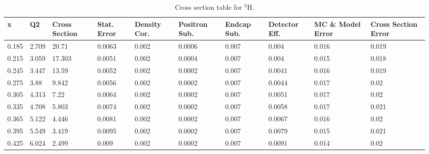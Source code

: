 \pagebreak
{}
\thispagestyle{lscape}
\begin{landscape}

	\begin{table}
			\centering
	\caption{Cross section table for $^3$H.}\label{CST_He3}
	\begin{tabular}{|p{1cm}|p{1cm}|p{1.5cm}|p{1.5cm}|p{2cm}|p{2cm}|p{1.5cm}|p{1.5cm}|p{2.5cm}|p{2.5cm}|}
	\hline
	x     & Q2     & Cross Section & Stat. Error & Density Cor. & Positron Sub. & Endcap Sub. & Detector Eff. & MC \& Model Error & Cross Section Error \\ \hline
		0.185 & 2.709  & 20.71         & 0.0063            & 0.002              & 0.0006               & 0.007              & 0.004                 & 0.016             & 0.019               \\ \hline
		0.215 & 3.059  & 17.303        & 0.0051            & 0.002              & 0.0004               & 0.007              & 0.004                 & 0.015             & 0.018               \\ \hline
		0.245 & 3.447  & 13.59         & 0.0052            & 0.002              & 0.0002               & 0.007              & 0.0041                & 0.016             & 0.019               \\ \hline
		0.275 & 3.88   & 9.842         & 0.0056            & 0.002              & 0.0002               & 0.007              & 0.0044                & 0.017             & 0.02                \\ \hline
		0.305 & 4.313  & 7.22          & 0.0064            & 0.002              & 0.0002               & 0.007              & 0.0051                & 0.017             & 0.02                \\ \hline
		0.335 & 4.708  & 5.803         & 0.0074            & 0.002              & 0.0002               & 0.007              & 0.0058                & 0.017             & 0.021               \\ \hline
		0.365 & 5.122  & 4.446         & 0.0081            & 0.002              & 0.0002               & 0.007              & 0.0067                & 0.016             & 0.02                \\ \hline
		0.395 & 5.549  & 3.419         & 0.0095            & 0.002              & 0.0002               & 0.007              & 0.0079                & 0.015             & 0.021               \\ \hline
		0.425 & 6.024  & 2.499         & 0.009             & 0.002              & 0.0002               & 0.007              & 0.0091                & 0.014             & 0.02                \\ \hline

\end{tabular}
\end{table}
\end{landscape}
